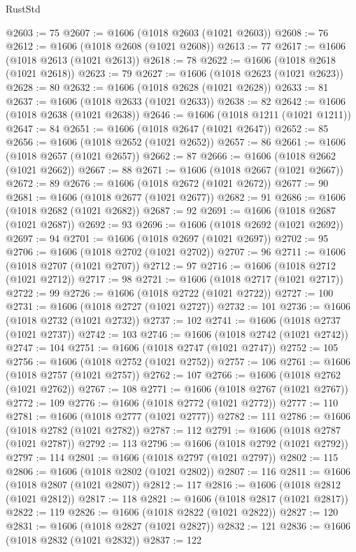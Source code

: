 \begin{lexlean}{RustStd}
\begin{coremodule}
@2603 := 75
@2607 := @1606 (@1018 @2603 (@1021 @2603))
@2608 := 76
@2612 := @1606 (@1018 @2608 (@1021 @2608))
@2613 := 77
@2617 := @1606 (@1018 @2613 (@1021 @2613))
@2618 := 78
@2622 := @1606 (@1018 @2618 (@1021 @2618))
@2623 := 79
@2627 := @1606 (@1018 @2623 (@1021 @2623))
@2628 := 80
@2632 := @1606 (@1018 @2628 (@1021 @2628))
@2633 := 81
@2637 := @1606 (@1018 @2633 (@1021 @2633))
@2638 := 82
@2642 := @1606 (@1018 @2638 (@1021 @2638))
@2646 := @1606 (@1018 @1211 (@1021 @1211))
@2647 := 84
@2651 := @1606 (@1018 @2647 (@1021 @2647))
@2652 := 85
@2656 := @1606 (@1018 @2652 (@1021 @2652))
@2657 := 86
@2661 := @1606 (@1018 @2657 (@1021 @2657))
@2662 := 87
@2666 := @1606 (@1018 @2662 (@1021 @2662))
@2667 := 88
@2671 := @1606 (@1018 @2667 (@1021 @2667))
@2672 := 89
@2676 := @1606 (@1018 @2672 (@1021 @2672))
@2677 := 90
@2681 := @1606 (@1018 @2677 (@1021 @2677))
@2682 := 91
@2686 := @1606 (@1018 @2682 (@1021 @2682))
@2687 := 92
@2691 := @1606 (@1018 @2687 (@1021 @2687))
@2692 := 93
@2696 := @1606 (@1018 @2692 (@1021 @2692))
@2697 := 94
@2701 := @1606 (@1018 @2697 (@1021 @2697))
@2702 := 95
@2706 := @1606 (@1018 @2702 (@1021 @2702))
@2707 := 96
@2711 := @1606 (@1018 @2707 (@1021 @2707))
@2712 := 97
@2716 := @1606 (@1018 @2712 (@1021 @2712))
@2717 := 98
@2721 := @1606 (@1018 @2717 (@1021 @2717))
@2722 := 99
@2726 := @1606 (@1018 @2722 (@1021 @2722))
@2727 := 100
@2731 := @1606 (@1018 @2727 (@1021 @2727))
@2732 := 101
@2736 := @1606 (@1018 @2732 (@1021 @2732))
@2737 := 102
@2741 := @1606 (@1018 @2737 (@1021 @2737))
@2742 := 103
@2746 := @1606 (@1018 @2742 (@1021 @2742))
@2747 := 104
@2751 := @1606 (@1018 @2747 (@1021 @2747))
@2752 := 105
@2756 := @1606 (@1018 @2752 (@1021 @2752))
@2757 := 106
@2761 := @1606 (@1018 @2757 (@1021 @2757))
@2762 := 107
@2766 := @1606 (@1018 @2762 (@1021 @2762))
@2767 := 108
@2771 := @1606 (@1018 @2767 (@1021 @2767))
@2772 := 109
@2776 := @1606 (@1018 @2772 (@1021 @2772))
@2777 := 110
@2781 := @1606 (@1018 @2777 (@1021 @2777))
@2782 := 111
@2786 := @1606 (@1018 @2782 (@1021 @2782))
@2787 := 112
@2791 := @1606 (@1018 @2787 (@1021 @2787))
@2792 := 113
@2796 := @1606 (@1018 @2792 (@1021 @2792))
@2797 := 114
@2801 := @1606 (@1018 @2797 (@1021 @2797))
@2802 := 115
@2806 := @1606 (@1018 @2802 (@1021 @2802))
@2807 := 116
@2811 := @1606 (@1018 @2807 (@1021 @2807))
@2812 := 117
@2816 := @1606 (@1018 @2812 (@1021 @2812))
@2817 := 118
@2821 := @1606 (@1018 @2817 (@1021 @2817))
@2822 := 119
@2826 := @1606 (@1018 @2822 (@1021 @2822))
@2827 := 120
@2831 := @1606 (@1018 @2827 (@1021 @2827))
@2832 := 121
@2836 := @1606 (@1018 @2832 (@1021 @2832))
@2837 := 122

\end{coremodule}
\end{lexlean}
